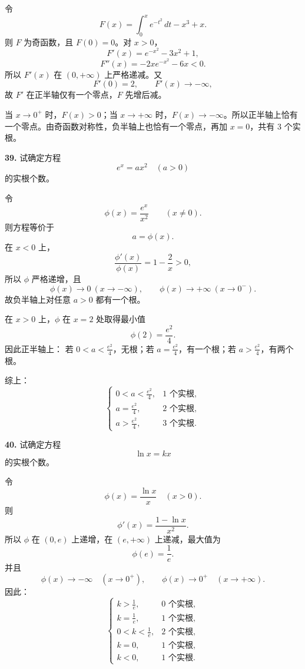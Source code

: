 \begin{solutionblock}
令
\[
F(x)=\int_0^x e^{-t^2}\,dt-x^3+x.
\]
则 \(F\) 为奇函数，且 \(F(0)=0\)。对 \(x>0\)，
\[
F'(x)=e^{-x^2}-3x^2+1,
\]
\[
F''(x)=-2xe^{-x^2}-6x<0.
\]
所以 \(F'(x)\) 在 \((0,+\infty)\) 上严格递减。又
\[
F'(0)=2,\qquad F'(x)\to-\infty,
\]
故 \(F'\) 在正半轴仅有一个零点，\(F\) 先增后减。

当 \(x\to0^+\) 时，\(F(x)>0\)；当 \(x\to+\infty\) 时，\(F(x)\to-\infty\)。所以正半轴上恰有一个零点。由奇函数对称性，负半轴上也恰有一个零点，再加 \(x=0\)，共有 3 个实根。
\end{solutionblock}

\begin{problemblock}
\textbf{39.} 试确定方程
\[
e^x=ax^2\quad(a>0)
\]
的实根个数。
\end{problemblock}

\begin{solutionblock}
令
\[
\phi(x)=\frac{e^x}{x^2}\qquad(x\ne0).
\]
则方程等价于
\[
a=\phi(x).
\]
在 \(x<0\) 上，
\[
\frac{\phi'(x)}{\phi(x)}=1-\frac2x>0,
\]
所以 \(\phi\) 严格递增，且
\[
\phi(x)\to0\ (x\to-\infty),\qquad \phi(x)\to+\infty\ (x\to0^-).
\]
故负半轴上对任意 \(a>0\) 都有一个根。

在 \(x>0\) 上，\(\phi\) 在 \(x=2\) 处取得最小值
\[
\phi(2)=\frac{e^2}{4}.
\]
因此正半轴上：
若 \(0<a<\frac{e^2}{4}\)，无根；若 \(a=\frac{e^2}{4}\)，有一个根；若 \(a>\frac{e^2}{4}\)，有两个根。

综上：
\[
\begin{cases}
0<a<\frac{e^2}{4},&1\text{ 个实根},\\
a=\frac{e^2}{4},&2\text{ 个实根},\\
a>\frac{e^2}{4},&3\text{ 个实根}.
\end{cases}
\]
\end{solutionblock}

\begin{problemblock}
\textbf{40.} 试确定方程
\[
\ln x=kx
\]
的实根个数。
\end{problemblock}

\begin{solutionblock}
令
\[
\phi(x)=\frac{\ln x}{x}\quad(x>0).
\]
则
\[
\phi'(x)=\frac{1-\ln x}{x^2}.
\]
所以 \(\phi\) 在 \((0,e)\) 上递增，在 \((e,+\infty)\) 上递减，最大值为
\[
\phi(e)=\frac1e.
\]
并且
\[
\phi(x)\to-\infty\quad(x\to0^+),\qquad
\phi(x)\to0^+\quad(x\to+\infty).
\]
因此：
\[
\begin{cases}
k>\frac1e,&0\text{ 个实根},\\
k=\frac1e,&1\text{ 个实根},\\
0<k<\frac1e,&2\text{ 个实根},\\
k=0,&1\text{ 个实根},\\
k<0,&1\text{ 个实根}.
\end{cases}
\]
\end{solutionblock}

